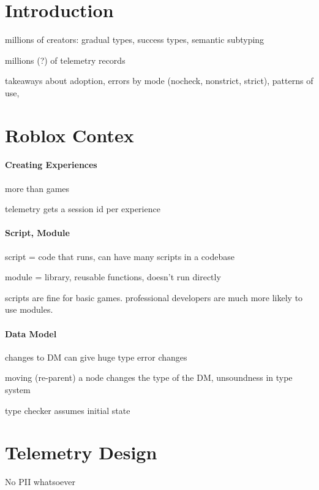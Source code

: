 \documentclass[acmsmall,review,anonymous]{acmart}
\begin{document}
\section{Introduction}
\label{s:introduction}

millions of creators:
 gradual types,
 success types,
 semantic subtyping

millions (?) of telemetry records

takeaways about adoption,
 errors by mode (nocheck, nonstrict, strict),
 patterns of use,


\section{Roblox Contex}

\paragraph{Creating Experiences}

more than games

telemetry gets a session id per experience


\paragraph{Script, Module}


script = code that runs, can have many scripts in a codebase

module = library, reusable functions, doesn't run directly

scripts are fine for basic games. professional developers are much more likely to use modules.


\paragraph{Data Model}

changes to DM can give huge type error changes

moving (re-parent) a node changes the type of the DM, unsoundness in type system

type checker assumes initial state


\section{Telemetry Design}

No PII whatsoever
\end{document}

